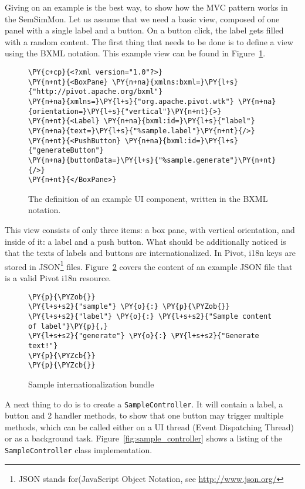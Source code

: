 Giving on an example is the best way, to show how the MVC pattern works in the SemSimMon. Let us assume that we need a basic view, composed of one panel with a single label and a button. On a button click, the label gets filled with a random content. The first thing that needs to be done is to define a view using the BXML notation. This example view can be found in Figure~\ref{fig:sample_view}.

\begin{figure}[ht]
\centering
\begin{Verbatim}[commandchars=\\\{\},frame=single,framerule=0.2pt] 
\PY{c+cp}{<?xml version="1.0"?>}
\PY{n+nt}{<BoxPane} \PY{n+na}{xmlns:bxml=}\PY{l+s}{"http://pivot.apache.org/bxml"}
\PY{n+na}{xmlns=}\PY{l+s}{"org.apache.pivot.wtk"} \PY{n+na}{orientation=}\PY{l+s}{"vertical"}\PY{n+nt}{>}
\PY{n+nt}{<Label} \PY{n+na}{bxml:id=}\PY{l+s}{"label"} \PY{n+na}{text=}\PY{l+s}{"%sample.label"}\PY{n+nt}{/>}
\PY{n+nt}{<PushButton} \PY{n+na}{bxml:id=}\PY{l+s}{"generateButton"}
\PY{n+na}{buttonData=}\PY{l+s}{"%sample.generate"}\PY{n+nt}{/>}
\PY{n+nt}{</BoxPane>}
\end{Verbatim} 
\caption{The definition of an example UI component, written in the BXML notation.}
\label{fig:sample_view}
\end{figure}

This view consists of only three items: a box pane, with vertical orientation, and inside of it: a label and a push button. What should be additionally noticed is that the texts of labels and buttons are internationalized. In Pivot, i18n keys are stored in JSON\footnote{JSON stands for(JavaScript Object Notation, see \url{http://www.json.org/}} files. Figure~\ref{fig:i18n} covers the content of an example JSON file that is a valid Pivot i18n resource. 

\begin{figure}[ht]
\centering
\begin{Verbatim}[commandchars=\\\{\},frame=single,framerule=0.2pt] 
\PY{p}{\PYZob{}}
\PY{l+s+s2}{"sample"} \PY{o}{:} \PY{p}{\PYZob{}}
\PY{l+s+s2}{"label"} \PY{o}{:} \PY{l+s+s2}{"Sample content of label"}\PY{p}{,}
\PY{l+s+s2}{"generate"} \PY{o}{:} \PY{l+s+s2}{"Generate text!"}
\PY{p}{\PYZcb{}}
\PY{p}{\PYZcb{}}
\end{Verbatim} 
\caption{Sample internationalization bundle}
\label{fig:i18n}
\end{figure}

A next thing to do is to create a \texttt{SampleController}. It will contain a label, a button and 2 handler methods, to show that one button may trigger multiple methods, which can be called either on a UI thread (Event Dispatching Thread) or as a background task. Figure~\ref{fig:sample_controller} shows a listing of the \texttt{SampleController} class implementation.

